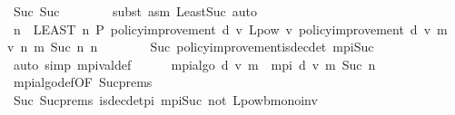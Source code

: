 \begin{isabellebody}
\ Suc{\isacharparenleft}{\kern0pt}{}{\isacharparenright}{\kern0pt}\ Suc\isanewline
\ \ \ \ \ \ \isamarkupfalse%
\ {\isacharparenleft}{\kern0pt}subst\ {\isacharparenleft}{\kern0pt}asm{\isacharparenright}{\kern0pt}\ Least{\isacharunderscore}{\kern0pt}Suc{\isacharparenright}{\kern0pt}\ auto\isanewline
\ \ \ \ \isamarkupfalse%
\ {\isachardoublequoteopen}n\ {\isacharequal}{\kern0pt}\ {\isacharparenleft}{\kern0pt}LEAST\ n{\isachardot}{\kern0pt}\ {\isacharquery}{\kern0pt}P\ {\isacharparenleft}{\kern0pt}policy{\isacharunderscore}{\kern0pt}improvement\ d\ v{\isacharparenright}{\kern0pt}\ {\isacharparenleft}{\kern0pt}L{\isacharunderscore}{\kern0pt}pow\ v\ {\isacharparenleft}{\kern0pt}policy{\isacharunderscore}{\kern0pt}improvement\ d\ v{\isacharparenright}{\kern0pt}\ {\isacharparenleft}{\kern0pt}m\ {}\ v{\isacharparenright}{\kern0pt}{\isacharparenright}{\kern0pt}\ {\isacharparenleft}{\kern0pt}{\isasymlambda}n{\isachardot}{\kern0pt}\ m\ {\isacharparenleft}{\kern0pt}Suc\ n{\isacharparenright}{\kern0pt}{\isacharparenright}{\kern0pt}\ n{\isacharparenright}{\kern0pt}{\isachardoublequoteclose}\isanewline
\ \ \ \ \ \ \isamarkupfalse%
\ Suc{\isacharparenleft}{\kern0pt}{}{\isacharparenright}{\kern0pt}\ policy{\isacharunderscore}{\kern0pt}improvement{\isacharunderscore}{\kern0pt}is{\isacharunderscore}{\kern0pt}dec{\isacharunderscore}{\kern0pt}det\ mpi{\isacharunderscore}{\kern0pt}Suc{\isacharprime}{\kern0pt}\ \isanewline
\ \ \ \ \ \ \isamarkupfalse%
\ {\isacharparenleft}{\kern0pt}auto\ simp{\isacharcolon}{\kern0pt}\ mpi{\isacharunderscore}{\kern0pt}val{\isacharunderscore}{\kern0pt}def{\isacharparenright}{\kern0pt}\isanewline
\ \ \ \ \isamarkupfalse%
\ {\isachardoublequoteopen}mpi{\isacharunderscore}{\kern0pt}algo\ d\ v\ m\ {\isacharequal}{\kern0pt}\ mpi\ d\ v\ m\ {\isacharparenleft}{\kern0pt}Suc\ n{\isacharparenright}{\kern0pt}{\isachardoublequoteclose}\isanewline
\ \ \ \ \ \ \isamarkupfalse%
\ mpi{\isacharunderscore}{\kern0pt}algo{\isacharunderscore}{\kern0pt}def{\isacharprime}{\kern0pt}{\isacharbrackleft}{\kern0pt}OF\ Suc{\isachardot}{\kern0pt}prems{\isacharparenleft}{\kern0pt}{}{\isacharminus}{\kern0pt}{}{\isacharparenright}{\kern0pt}{\isacharbrackright}{\kern0pt}\isanewline
\ \ \ \ \ \ \isamarkupfalse%
\ Suc{\isacharparenleft}{\kern0pt}{}{\isacharparenright}{\kern0pt}\ Suc{\isachardot}{\kern0pt}prems{\isacharparenleft}{\kern0pt}{}{\isacharminus}{\kern0pt}{}{\isacharparenright}{\kern0pt}\ is{\isacharunderscore}{\kern0pt}dec{\isacharunderscore}{\kern0pt}det{\isacharunderscore}{\kern0pt}pi\ mpi{\isacharunderscore}{\kern0pt}Suc{\isacharprime}{\kern0pt}\ not{}\ L{\isacharunderscore}{\kern0pt}pow{\isacharunderscore}{\kern0pt}{\isasymL}\isactrlsub b{\isacharunderscore}{\kern0pt}mono{\isacharunderscore}{\kern0pt}inv\ \isamarkupfalse%

\end{isabellebody}
